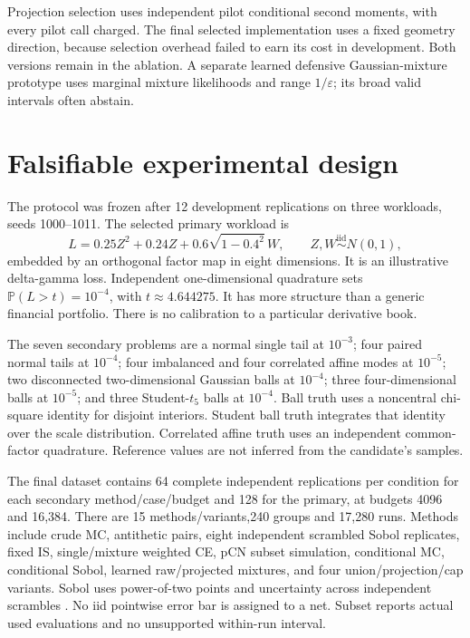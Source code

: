 \documentclass[11pt]{article}
\newcommand{\Pp}{\mathbb P}
\begin{document}
Projection selection uses independent pilot conditional second moments, with every pilot call charged. The final selected implementation uses a fixed geometry direction, because selection overhead failed to earn its cost in development. Both versions remain in the ablation. A separate learned defensive Gaussian-mixture prototype uses marginal mixture likelihoods and range $1/\varepsilon $; its broad valid intervals often abstain.

\section{Falsifiable experimental design}
The protocol was frozen after 12 development replications on three workloads, seeds 1000--1011. The selected primary workload is
\begin{equation}
 L=0.25 Z^2+0.24Z+0.6\sqrt{1-0.4^2}\,W,
 \qquad Z,W\overset{\mathrm{iid}}\sim N(0,1),
\end{equation}
embedded by an orthogonal factor map in eight dimensions. It is an illustrative delta-gamma loss. Independent one-dimensional quadrature sets $\Pp(L>t)=10^{-4}$, with $ t\approx 4.644275 $. It has more structure than a generic financial portfolio. There is no calibration to a particular derivative book.

The seven secondary problems are a normal single tail at $10^{-3}$; four paired normal tails at $10^{-4}$; four imbalanced and four correlated affine modes at $10^{-5}$; two disconnected two-dimensional Gaussian balls at $10^{-4}$; three four-dimensional balls at $10^{-5}$; and three Student-$ t_5 $ balls at $10^{-4}$. Ball truth uses a noncentral chi-square identity for disjoint interiors. Student ball truth integrates that identity over the scale distribution. Correlated affine truth uses an independent common-factor quadrature. Reference values are not inferred from the candidate's samples.

The final dataset contains 64 complete independent replications per condition for each secondary method/case/budget and 128 for the primary, at budgets 4096 and 16,384. There are 15 methods/variants,240 groups and 17,280 runs. Methods include crude MC, antithetic pairs, eight independent scrambled Sobol replicates, fixed IS, single/mixture weighted CE, pCN subset simulation, conditional MC, conditional Sobol, learned raw/projected mixtures, and four union/projection/cap variants. Sobol uses power-of-two points and uncertainty across independent scrambles \citep{scipyqmc}. No iid pointwise error bar is assigned to a net. Subset reports actual used evaluations and no unsupported within-run interval.
\end{document}
